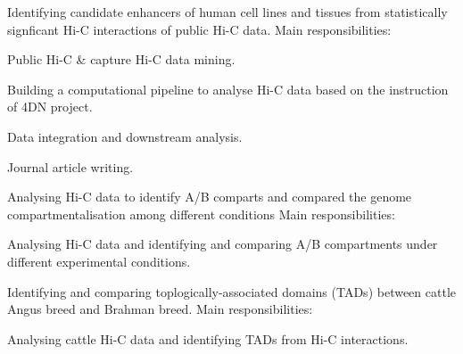 \documentclass[]{deedy-resume-openfont}
\begin{document}
Identifying candidate enhancers of human cell lines and tissues from statistically signficant Hi-C interactions of public Hi-C data.
Main responsibilities:
\begin{tightemize}
\item Public Hi-C \& capture Hi-C data mining.
\item Building a computational pipeline to analyse Hi-C data based on the instruction of 4DN project.
\item Data integration and downstream analysis.
\item Journal article writing.
\end{tightemize}
\sectionsep

Analysing Hi-C data to identify A/B comparts and compared the genome compartmentalisation among different conditions
Main responsibilities:
\begin{tightemize}
\item Analysing Hi-C data and identifying and comparing A/B compartments under different experimental conditions.
\end{tightemize}
\sectionsep

Identifying and comparing toplogically-associated domains (TADs) between cattle Angus breed and Brahman breed.
Main responsibilities:
\begin{tightemize}
\item Analysing cattle Hi-C data and identifying TADs from Hi-C interactions.
\end{tightemize}
\sectionsep

\end{document}
